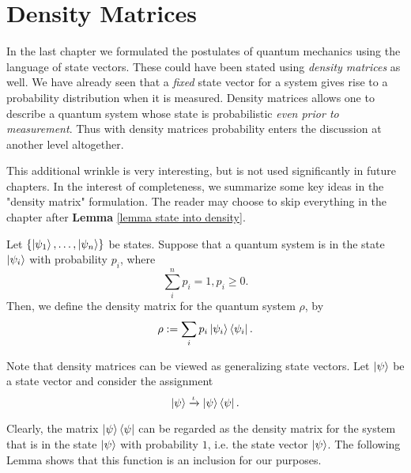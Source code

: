 
\chapter{Density Matrices} %

\label{Chapter4-density matrix} %

In the last chapter we formulated the postulates of quantum mechanics using the language of state vectors. These could have been stated using \textit{density matrices} as well. We have already seen that a {\emph{fixed}} state vector for a system gives rise to a probability distribution when it is measured.  Density matrices allows one to describe a quantum system whose state is probabilistic {\emph{even prior to measurement}}.  Thus with density matrices probability enters the discussion at another level altogether.

This additional wrinkle is very interesting, but is not used significantly in future chapters.  In the interest of completeness, we summarize some key ideas in the "density matrix" formulation.  The reader may choose to skip everything in the chapter after {\bf{Lemma}} \ref{lemma state into density}.

\begin{definition}
Let $\{\ket{\psi_1},\hdots,\ket{\psi_n}\}$ be states.  Suppose that a quantum system is in the state $\ket{\psi_i}$ with probability $p_i$, where  
\begin{equation}
\sum\limits_i^n p_i=1, p_i \geq 0.
\end{equation}
Then, we define the density matrix for the quantum system $\rho$, by 
\begin{equation}
    \rho:=\sum_i p_i \ket{\psi_i}\bra{\psi_i}.
\end{equation}
\end{definition}

Note that density matrices can be viewed as generalizing state vectors.  Let $\ket{\psi}$ be a state vector and consider the assignment
$$\ket{\psi} \xrightarrow{\iota} \ket{\psi}\bra{\psi}.$$

Clearly, the matrix $\ket{\psi}\bra{\psi}$ can be regarded as the density matrix for the system that is in the state $\ket{\psi}$ with probability $1$, i.e. the state vector $\ket{\psi}$.  The following Lemma shows that this function is an inclusion for our purposes.

